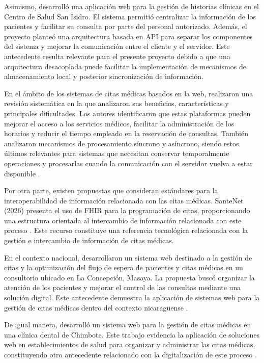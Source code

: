 Asimismo, \textcite{quispe2018} desarrolló una aplicación web para la gestión de historias clínicas en el Centro de Salud San Isidro. El sistema permitió centralizar la información de los pacientes y facilitar su consulta por parte del personal autorizado. Además, el proyecto planteó una arquitectura basada en API para separar los componentes del sistema y mejorar la comunicación entre el cliente y el servidor. Este antecedente resulta relevante para el presente proyecto debido a que una arquitectura desacoplada puede facilitar la implementación de mecanismos de almacenamiento local y posterior sincronización de información.

En el ámbito de los sistemas de citas médicas basados en la web, \textcite{zhao2017} realizaron una revisión sistemática en la que analizaron sus beneficios, características y principales dificultades. Los autores identificaron que estas plataformas pueden mejorar el acceso a los servicios médicos, facilitar la administración de los horarios y reducir el tiempo empleado en la reservación de consultas. También analizaron mecanismos de procesamiento síncrono y asíncrono, siendo estos últimos relevantes para sistemas que necesitan conservar temporalmente operaciones y procesarlas cuando la comunicación con el servidor vuelva a estar disponible \parencite{zhao2017}.

Por otra parte, existen propuestas que consideran estándares para la interoperabilidad de información relacionada con las citas médicas. SanteNet (2026) presenta el uso de FHIR para la programación de citas, proporcionando una estructura orientada al intercambio de información relacionada con este proceso \parencite{santenet2026}. Este recurso constituye una referencia tecnológica relacionada con la gestión e intercambio de información de citas médicas.

En el contexto nacional, \textcite{siero2025} desarrollaron un sistema web destinado a la gestión de citas y la optimización del flujo de espera de pacientes y citas médicas en un consultorio ubicado en La Concepción, Masaya. La propuesta buscó organizar la atención de los pacientes y mejorar el control de las consultas mediante una solución digital. Este antecedente demuestra la aplicación de sistemas web para la gestión de citas médicas dentro del contexto nicaragüense \parencite{siero2025}.

De igual manera, \textcite{valera2024} desarrolló un sistema web para la gestión de citas médicas en una clínica dental de Chimbote. Este trabajo evidencia la aplicación de soluciones web en establecimientos de salud para organizar y administrar las citas médicas, constituyendo otro antecedente relacionado con la digitalización de este proceso \parencite{valera2024}.

